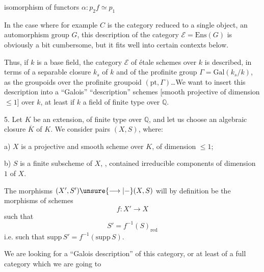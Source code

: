 isomorphism of functors $\alpha:p_2f\simeq p_1$

In the case where for example $C$ is the category reduced to a single object, an automorphism group $G$, this description of the category $\mathcal E=\mathrm{Ens}(G)$ is obviously a bit cumbersome, but it fits well into certain contexts below.

Thus, if $k$ is a base field, the  category $\mathcal E$ of étale schemes over $k$ is described, in terms of a separable closure  $k_s$ of $k$ and of the profinite group $\Gamma=\mathrm{Gal}(k_s/k)$, as the  groupoids over the profinite groupoid $(\mathrm{pt},\Gamma)$\dots We want to insert this description into a ``Galois'' ``description''  \inserted{[certain]} schemes [smooth projective of dimension $\leq 1$] over $k$, at least if $k$ a field of finite type over $\mathbb Q$.



5. Let $K$ be an extension, of finite type over $\mathbb Q$, and let us choose an algebraic closure $\overline K$ of $K$.
 We consider pairs $(X,S)$, where: 

a) $X$ is a projective and smooth scheme over $K$, of dimension $\leq 1$;

b) $S$ is a finite  subscheme of $X$, , contained     irreducible components of dimension $1$ of $X$.

The morphisms $(X',S')\unsure{\longrightarrow|-}(X,S)$ will by definition be the morphisms of schemes
\[
f:X'\longrightarrow X
\]
such that
\[
S'=f^{-1}(S)_{\mathrm{red}}
\]
i.e. such that $\mathrm{supp}\,S'=f^{-1}(\mathrm{supp}\,S)$.

We are looking for a ``Galois description'' of this category, or at least of a full category  which we are going to

